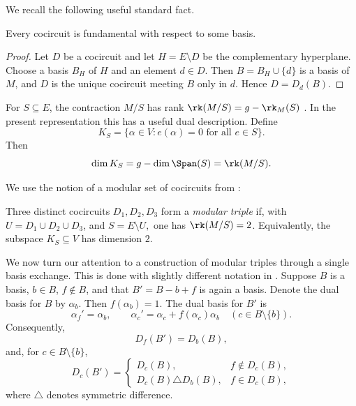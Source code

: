 \documentclass[11pt,letterpaper]{amsart}
\begin{document}
We recall the following useful standard fact.

\begin{lemma}\label{lem:every-cocircuit-fundamental}
Every cocircuit is fundamental with respect to some basis.
\end{lemma}

\begin{proof}
Let $D$ be a cocircuit and let $H=E\setminus D$ be the complementary hyperplane.  Choose a basis $B_H$ of $H$ and an element $d\in D$.  Then $B=B_H\cup\{d\}$ is a basis of $M$, and $D$ is the unique cocircuit meeting $B$ only in $d$.  Hence $D=D_d(B)$.
\end{proof}

For $S\subseteq E$, the contraction $M/S$ has rank $\rk(M/S)=g-\rk_M(S)$ \cite[Proposition 3.1.6]{oxley}.
In the present representation this has a useful dual description.  Define
\begin{equation*}
  K_S=\{\alpha\in V:e(\alpha)=0\text{ for all }e\in S\}.
\end{equation*}
Then
\begin{equation*}
  \dim K_S=g-\dim\Span(S)=\rk(M/S).
\end{equation*}

We use the notion of a modular set of cocircuits from \cite{pendavingh2013skew}:

\begin{definition}\label{def:modulartriple}
Three distinct cocircuits $D_1,D_2,D_3$ form a \emph{modular triple} if, with $U=D_1\cup D_2\cup D_3$, and $S=E\setminus U,$ one has $\rk(M/S)=2$. Equivalently, the subspace $K_S\subseteq V$ has dimension $2$.
\end{definition}

We now turn our attention to a construction of modular triples through a single basis exchange. This is done with slightly different notation in \cite{pendavingh2013skew}. Suppose $B$ is a basis, $b\in B$, $f\notin B$, and that $B'=B-b+f$ is again a basis. Denote the dual basis for $B$ by $\alpha_b$.  Then $f(\alpha_b)=1$.  The dual basis for $B'$ is
\begin{equation*}
  \alpha_f'=\alpha_b,
  \qquad
  \alpha_c'=\alpha_c+f(\alpha_c)\alpha_b
  \quad(c\in B\setminus\{b\}).
\end{equation*}
Consequently,
\begin{equation}\label{eq:cocircuit-pivot}
  D_f(B')=D_b(B),
\end{equation}
and, for $c\in B\setminus\{b\}$,
\begin{equation}\label{eq:cocircuit-pivot-2}
  D_c(B')=
  \begin{cases}
    D_c(B),& f\notin D_c(B),\\
    D_c(B)\triangle D_b(B),& f\in D_c(B),
  \end{cases}
\end{equation}
where $\triangle$ denotes symmetric difference.
\end{document}
